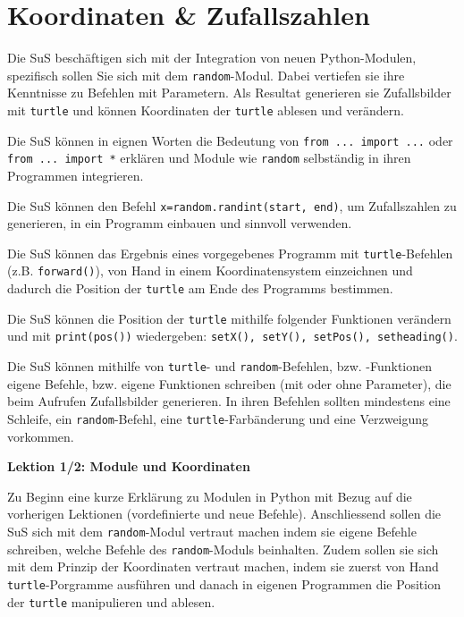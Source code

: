\section{Koordinaten \& Zufallszahlen}
\begin{myExBox}
	Die SuS beschäftigen sich mit der Integration von neuen Python-Modulen, spezifisch sollen Sie sich mit dem \lstinline|random|-Modul. Dabei vertiefen sie ihre Kenntnisse zu Befehlen mit Parametern. Als Resultat generieren sie Zufallsbilder mit \lstinline|turtle| und können Koordinaten der \lstinline|turtle| ablesen und verändern.


	\begin{todolist}
		\item Die SuS können in eignen Worten die Bedeutung von \lstinline|from ... import ...| oder \lstinline|from ... import *| erklären und Module wie \lstinline|random| selbständig in ihren Programmen integrieren.
		\item Die SuS können den Befehl \lstinline|x=random.randint(start, end)|, um Zufallszahlen zu generieren, in ein Programm einbauen und sinnvoll verwenden.
		\item Die SuS können das Ergebnis eines vorgegebenes Programm mit \lstinline|turtle|-Befehlen (z.B. \lstinline|forward()|), von Hand in einem Koordinatensystem einzeichnen und dadurch die Position der \lstinline|turtle| am Ende des Programms bestimmen.
		\item Die SuS können die Position der \lstinline|turtle| mithilfe folgender Funktionen verändern und mit \lstinline|print(pos())| wiedergeben: \lstinline|setX(), setY(), setPos(), setheading()|.
		\item Die SuS können mithilfe von \lstinline|turtle|- und \lstinline|random|-Befehlen, bzw. -Funktionen eigene Befehle, bzw. eigene Funktionen schreiben (mit oder ohne Parameter), die beim Aufrufen Zufallsbilder generieren. In ihren Befehlen sollten mindestens eine Schleife, ein \lstinline|random|-Befehl, eine \lstinline|turtle|-Farbänderung und eine Verzweigung vorkommen.
	\end{todolist}

	\textbf{Lektion 1/2: Module und Koordinaten}

	Zu Beginn eine kurze Erklärung zu Modulen in Python mit Bezug auf die vorherigen Lektionen (vordefinierte und neue Befehle). Anschliessend sollen die SuS sich mit dem \lstinline|random|-Modul vertraut machen indem sie eigene Befehle schreiben, welche Befehle des \lstinline|random|-Moduls beinhalten. Zudem sollen sie sich mit dem Prinzip der Koordinaten vertraut machen, indem sie zuerst von Hand \lstinline|turtle|-Porgramme ausführen und danach in eigenen Programmen die Position der \lstinline|turtle| manipulieren und ablesen.


\end{myExBox}
